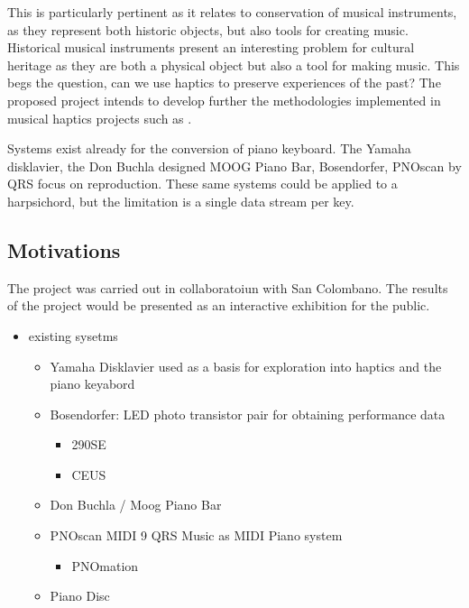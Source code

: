 This is particularly pertinent as it relates to conservation of musical
instruments, as they represent both historic objects, but also tools for
creating music. Historical musical instruments present an interesting
problem for cultural heritage as they are both a physical object but
also a tool for making music. This begs the question, can we use haptics
to preserve experiences of the past? The proposed project intends to
develop further the methodologies implemented in musical haptics
projects \cite{MusicalHaptics2018} such as \cite{Timmermans2020}.

Systems exist already for the conversion of piano keyboard. The Yamaha
disklavier, the Don Buchla designed MOOG Piano Bar, Bosendorfer, PNOscan
by QRS focus on reproduction. These same systems could be applied to a
harpsichord, but the limitation is a single data stream per key.

\subsection{Motivations}\label{motivations}

The project was carried out in collaboratoiun with San Colombano. The
results of the project would be presented as an interactive exhibition
for the public.

\begin{itemize}
\item
  existing sysetms

  \begin{itemize}
  \item
    Yamaha Disklavier used as a basis for exploration into haptics and
    the piano keyabord
    \cite{MusicalHaptics2018_04, MusicalHaptics2018_05,
    MusicalHaptics2018_13}
  \item
    Bosendorfer: LED photo transistor pair \cite{Moog1990} for obtaining
    performance data \cite{MusicalHaptics2018_05}

    \begin{itemize}
    \item
      290SE
    \item
      CEUS
    \end{itemize}
  \item
    Don Buchla / Moog Piano Bar
  \item
    PNOscan MIDI 9 QRS Music as MIDI Piano system \cite{McPherson2013}

    \begin{itemize}
    \item
      PNOmation
    \end{itemize}
  \item
    Piano Disc
  \end{itemize}
\end{itemize}

